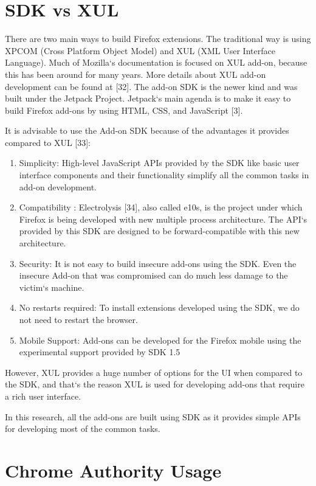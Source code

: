 \section{SDK vs XUL} 

There are two main ways to build Firefox extensions. The traditional way is using XPCOM (Cross Platform Object Model) and XUL (XML User Interface Language). Much of Mozilla`s documentation is focused on XUL add-on, because this has been around for many years. More details about XUL add-on development can be found at [32]. The add-on SDK is the newer kind and was built under the Jetpack Project. Jetpack`s main agenda is to make it easy to build Firefox add-ons by using HTML, CSS, and JavaScript [3].

It is advisable to use the Add-on SDK because of the advantages it provides compared to XUL [33]:

\begin{enumerate}
\item Simplicity: High-level JavaScript APIs provided by the SDK like basic user interface components and their functionality simplify all the common tasks in add-on development. 
\item Compatibility : Electrolysis [34], also called e10s, is the project under which Firefox is being developed with new multiple process architecture. The API`s provided by this SDK are designed to be forward-compatible with this new architecture. 
\item Security: It is not easy to build insecure add-ons using the SDK. Even the insecure Add-on that was compromised can do much less damage to the victim`s machine.
\item No restarts required: To install extensions developed using the SDK, we do not need to restart the browser.
\item Mobile Support: Add-ons can be developed for the Firefox mobile using the experimental support provided by SDK 1.5
\end{enumerate}

However, XUL provides a huge number of options for the UI when compared to the SDK, and that`s the reason XUL is used for developing add-ons that require a rich user interface.

In this research, all the add-ons are built using SDK as it provides simple APIs for developing most of the common tasks.

\section{Chrome Authority Usage}

